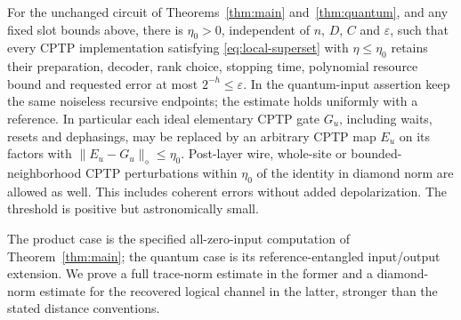 \begin{maintheorem}\label{thm:general}
For the unchanged circuit of Theorems~\ref{thm:main} and~\ref{thm:quantum}, and any fixed slot bounds above, there is $\eta_0>0$, independent of $n$, $D$, $C$ and $\varepsilon$, such that every CPTP implementation satisfying \eqref{eq:local-superset} with $\eta\le\eta_0$ retains their preparation, decoder, rank choice, stopping time, polynomial resource bound and requested error at most $2^{-h}\le\varepsilon$. In the quantum-input assertion keep the same noiseless recursive endpoints; the estimate holds uniformly with a reference. In particular each ideal elementary CPTP gate $G_u$, including waits, resets and dephasings, may be replaced by an arbitrary CPTP map $E_u$ on its factors with $\|E_u-G_u\|_\diamond\le\eta_0$. Post-layer wire, whole-site or bounded-neighborhood CPTP perturbations within $\eta_0$ of the identity in diamond norm are allowed as well. This includes coherent errors without added depolarization. The threshold is positive but astronomically small.
\end{maintheorem}

The product case is the specified all-zero-input computation of Theorem~\ref{thm:main}; the quantum case is its reference-entangled input/output extension. We prove a full trace-norm estimate in the former and a diamond-norm estimate for the recovered logical channel in the latter, stronger than the stated distance conventions.

